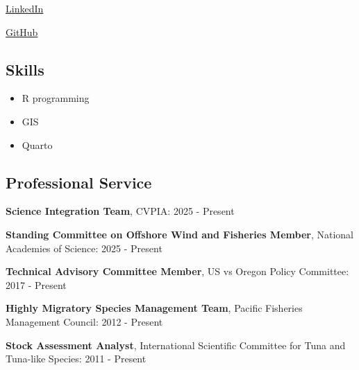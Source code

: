 \documentclass[
  letterpaper,
  DIV=11,
  numbers=noendperiod]{scrartcl}
\providecommand{\tightlist}{%
  \setlength{\itemsep}{0pt}\setlength{\parskip}{0pt}}
\begin{document}
\href{https://www.linkedin.com/in/tim-sippel-704b5313}{
LinkedIn}

\href{https://github.com/tsippel10}{ GitHub}

\subsection{Skills}\label{skills}

\begin{itemize}
\tightlist
\item
  R programming
\item
  GIS
\item
  Quarto
\end{itemize}

\subsection{Professional Service}\label{professional-service}

\textbf{Science Integration Team}, CVPIA: 2025 - Present

\textbf{Standing Committee on Offshore Wind and Fisheries Member},
National Academies of Science: 2025 - Present

\textbf{Technical Advisory Committee Member}, US vs Oregon Policy
Committee: 2017 - Present

\textbf{Highly Migratory Species Management Team}, Pacific Fisheries
Management Council: 2012 - Present

\textbf{Stock Assessment Analyst}, International Scientific Committee
for Tuna and Tuna-like Species: 2011 - Present
\end{document}
